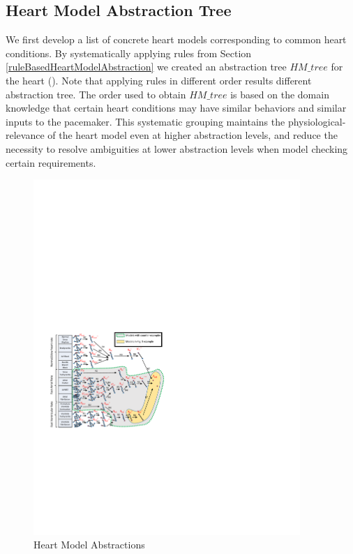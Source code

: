 \subsection{Heart Model Abstraction Tree}
We first develop a list of concrete heart models corresponding to common heart conditions. 
By systematically applying rules from Section \ref{ruleBasedHeartModelAbstraction} we created an abstraction tree $HM\_tree$ for the heart (). 
Note that applying rules in different order results different abstraction tree. 
The order used to obtain $HM\_tree$ is based on the domain knowledge that certain heart conditions may have similar behaviors and similar inputs to the pacemaker. 
This systematic grouping maintains the physiological-relevance of the heart model even at higher abstraction levels, and reduce the necessity to resolve ambiguities at lower abstraction levels when model checking certain requirements.
\begin{figure}[!t]
	\centering
	\includegraphics[width=0.9\textwidth]{figs/abs.pdf}
	\caption{\small Heart Model Abstractions}
	\label{fig:HM_abs}
\end{figure}


